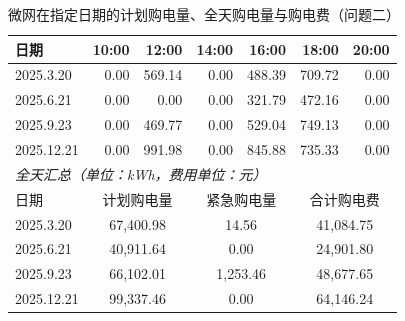 
\begin{table}[htbp]
  \centering
  \caption{微网在指定日期的计划购电量、全天购电量与购电费（问题二）}
  \label{tab:p2-buy}
  \footnotesize
  \begin{tabular}{lrrrrrr}
    \toprule
    日期 & 10:00 & 12:00 & 14:00 & 16:00 & 18:00 & 20:00 \\
    \midrule
    2025.3.20 & 0.00 & 569.14 & 0.00 & 488.39 & 709.72 & 0.00 \\
    2025.6.21 & 0.00 & 0.00 & 0.00 & 321.79 & 472.16 & 0.00 \\
    2025.9.23 & 0.00 & 469.77 & 0.00 & 529.04 & 749.13 & 0.00 \\
    2025.12.21 & 0.00 & 991.98 & 0.00 & 845.88 & 735.33 & 0.00 \\
    \midrule
    \multicolumn{7}{l}{\textit{全天汇总（单位：kWh，费用单位：元）}} \\
    \midrule
    日期 & \multicolumn{2}{c}{计划购电量} & \multicolumn{2}{c}{紧急购电量} & \multicolumn{2}{c}{合计购电费} \\
    \midrule
    2025.3.20 & \multicolumn{2}{c}{67,400.98} & \multicolumn{2}{c}{14.56} & \multicolumn{2}{c}{41,084.75} \\
    2025.6.21 & \multicolumn{2}{c}{40,911.64} & \multicolumn{2}{c}{0.00} & \multicolumn{2}{c}{24,901.80} \\
    2025.9.23 & \multicolumn{2}{c}{66,102.01} & \multicolumn{2}{c}{1,253.46} & \multicolumn{2}{c}{48,677.65} \\
    2025.12.21 & \multicolumn{2}{c}{99,337.46} & \multicolumn{2}{c}{0.00} & \multicolumn{2}{c}{64,146.24} \\
    \bottomrule
  \end{tabular}
\end{table}

